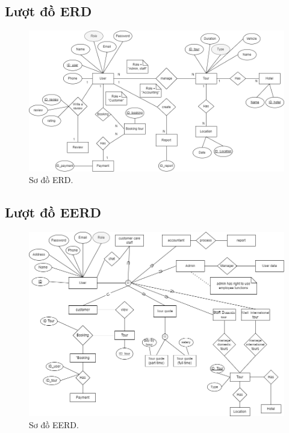 \subsection{Lượt đồ ERD}

\vspace{7cm}

\begin{figure}[ht]
    \centering
    \includegraphics[width = 1.2\linewidth]{figures/ERD.png}
    \caption{Sơ đồ ERD.}
    \label{fig:example_1}
\end{figure}

\subsection{Lượt đồ EERD}

\vspace{7cm}

\begin{figure}[ht]
    \centering
    \includegraphics[width = 1.2\linewidth]{figures/EERD.png}
    \caption{Sơ đồ EERD.}
    \label{fig:example_1}
\end{figure}

